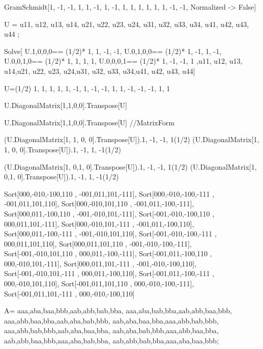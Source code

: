 



GramSchmidt[{{1, -1, -1, 1}, {1, -1, 1, -1}, {1, 1, 1, 1}, {1, 1, -1, -1}},
  Normalized -> False]


U = {
{u11, u12, u13, u14},
{u21, u22, u23, u24},
{u31, u32, u33, u34},
{u41, u42, u43, u44}
};

Solve[{
U.{1,0,0,0}== (1/2)* {1, 1, -1, -1},
U.{0,1,0,0}== (1/2)* {1, -1, 1, -1},
U.{0,0,1,0}== (1/2)* {1, 1, 1, 1},
U.{0,0,0,1}== (1/2)* {1, -1, -1, 1}
},{u11, u12, u13, u14,u21, u22, u23, u24,u31, u32, u33, u34,u41, u42, u43, u44}]

U=(1/2)
{{ 1,  1, 1,  1},
 { 1, -1, 1, -1},
 {-1,  1, 1, -1},
 {-1, -1, 1, 1}}

U.DiagonalMatrix[{1,1,0,0}].Transpose[U]

U.DiagonalMatrix[{1,1,0,0}].Transpose[U]  //MatrixForm

(U.DiagonalMatrix[{1, 1, 0, 0}].Transpose[U]).{1, -1, -1, 1}(1/2)
(U.DiagonalMatrix[{1, 1, 0, 0}].Transpose[U]).{1, -1, 1, -1}(1/2)

(U.DiagonalMatrix[{1,  0,1, 0}].Transpose[U]).{1, -1, -1, 1}(1/2)
(U.DiagonalMatrix[{1,  0,1, 0}].Transpose[U]).{1, -1, 1, -1}(1/2)

{               Sort[{000,-010,-100,110 ,  -001,011,101,-111}],
                Sort[{000,-010,-100,-111 ,  -001,011,101,110}],
                Sort[{000,-010,101,110 ,  -001,011,-100,-111}],
                Sort[{000,011,-100,110 ,  -001,-010,101,-111}],
                Sort[{-001,-010,-100,110 ,  000,011,101,-111}],
                Sort[{000,-010,101,-111 ,  -001,011,-100,110}],
                Sort[{000,011,-100,-111 ,  -001,-010,101,110}],
                Sort[{-001,-010,-100,-111 ,  000,011,101,110}],
                Sort[{000,011,101,110 ,  -001,-010,-100,-111}],
                Sort[{-001,-010,101,110 ,  000,011,-100,-111}],
                Sort[{-001,011,-100,110 ,  000,-010,101,-111}],
                Sort[{000,011,101,-111 ,  -001,-010,-100,110}],
                Sort[{-001,-010,101,-111 ,  000,011,-100,110}],
                Sort[{-001,011,-100,-111 ,  000,-010,101,110}],
                Sort[{-001,011,101,110 ,  000,-010,-100,-111}],
                Sort[{-001,011,101,-111 ,  000,-010,-100,110}]}



A=               {{aaa,aba,baa,bbb,aab,abb,bab,bba},
                  {aaa,aba,bab,bba,aab,abb,baa,bbb},
                  {aaa,abb,baa,bba,aab,aba,bab,bbb},
                  {aab,aba,baa,bba,aaa,abb,bab,bbb},
                  {aaa,abb,bab,bbb,aab,aba,baa,bba},
                  {aab,aba,bab,bbb,aaa,abb,baa,bba},
                  {aab,abb,baa,bbb,aaa,aba,bab,bba},
                  {aab,abb,bab,bba,aaa,aba,baa,bbb}};





